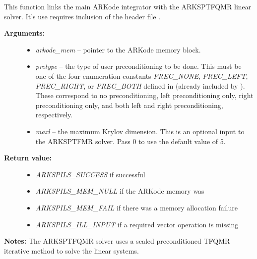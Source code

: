 \documentclass[letterpaper,10pt,english]{sphinxmanual}
\begin{document}

\begin{fulllineitems}
\label{c_interface/User_callable:c.ARKSptfqmr}
This function links the main ARKode integrator with the ARKSPTFQMR
linear solver.  It's use requires inclusion of the header file
.
\begin{description}
\item[{\textbf{Arguments:}}] \leavevmode\begin{itemize}
\item {} 
\emph{arkode\_mem} -- pointer to the ARKode memory block.

\item {} 
\emph{pretype} -- the type of user preconditioning to be done.  This
must be one of the four enumeration constants \emph{PREC\_NONE},
\emph{PREC\_LEFT}, \emph{PREC\_RIGHT}, or \emph{PREC\_BOTH} defined in
 (already included by
). These correspond to no preconditioning,
left preconditioning only, right preconditioning only, and
both left and right preconditioning, respectively.

\item {} 
\emph{maxl} -- the maximum Krylov dimension. This is an optional input
to the ARKSPTFMR solver. Pass 0 to use the default value of 5.

\end{itemize}

\item[{\textbf{Return value:}}] \leavevmode\begin{itemize}
\item {} 
\emph{ARKSPILS\_SUCCESS} if successful

\item {} 
\emph{ARKSPILS\_MEM\_NULL}  if the ARKode memory was 

\item {} 
\emph{ARKSPILS\_MEM\_FAIL}  if there was a memory allocation failure

\item {} 
\emph{ARKSPILS\_ILL\_INPUT} if a required vector operation is missing

\end{itemize}

\end{description}

\textbf{Notes:} The ARKSPTFQMR solver uses a scaled preconditioned TFQMR
iterative method to solve the linear systems.

\end{fulllineitems}
\end{document}
